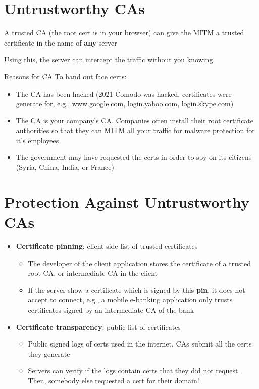 \documentclass[11pt]{article}
\begin{document}
\section*{Untrustworthy CAs}

A trusted CA (the root cert is in your browser) can give the MITM a trusted certificate in the name of \textbf{any} server

Using this, the server can intercept the traffic without you knowing.

Reasons for CA To hand out face certs:
\begin{itemize}
	\item The CA has been hacked (2021 Comodo was hacked, certificates were generate for, e.g., www.google.com, login.yahoo.com, login.skype.com)
	\item The CA is your company's CA. Companies often install their root certificate authorities so that they can MITM all your traffic for malware protection for it's employees 
	\item The government may have requested the certs in order to spy on its citizens (Syria, China, India, or France)
\end{itemize}

\section*{Protection Against Untrustworthy CAs}

\begin{itemize}
	\item \textbf{Certificate pinning}: client-side list of trusted certificates
	\begin{itemize}
		\item The developer of the client application stores the certificate of a trusted root CA, or intermediate CA in the client
		\item If the server show a certificate which is signed by this \textbf{pin}, it does not accept to connect, e.g., a mobile e-banking application only trusts certificates signed by an intermediate CA of the bank
	\end{itemize}
	\item \textbf{Certificate transparency}: public list of certificates
	\begin{itemize}
		\item Public signed logs of certs used in the internet. CAs submit all the certs they generate
		\item Servers can verify if the logs contain certs that they did not request. Then, somebody else requested a cert for their domain!
	\end{itemize}
\end{itemize}
\end{document}
